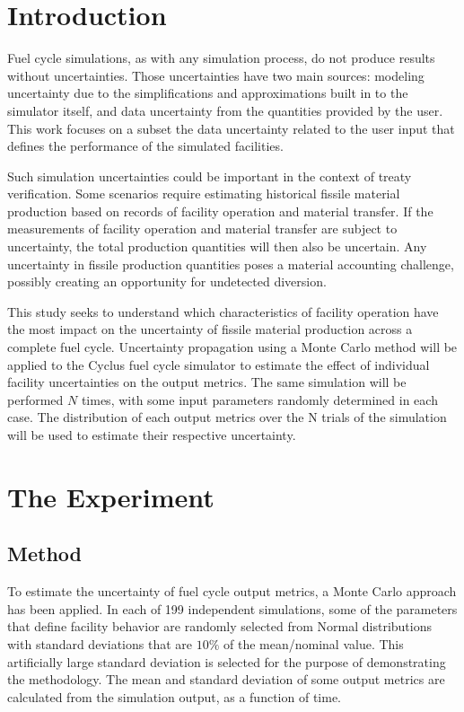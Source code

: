 \documentclass{anstrans}
\title{}
\author{Baptiste Mouginot, Kathryn Mummah, Paul P.H.  Wilson}
\institute{
University of Wisconsin-Madison, Madison, WI
}
\begin{document}
\section{Introduction}

Fuel cycle simulations, as with any simulation process, do not produce results
without uncertainties.  Those uncertainties have two main sources: modeling
uncertainty due to the simplifications and approximations built in to the
simulator itself, and data uncertainty from the quantities provided by the
user. This work focuses on a subset the data uncertainty related to
the user input that defines the performance of the simulated facilities.

Such simulation uncertainties could be important in the context of treaty
verification.  Some scenarios require estimating historical fissile material
production based on records of facility operation and material transfer.  If
the measurements of facility operation and material transfer are subject to
uncertainty, the total production quantities will then also be uncertain.  Any
uncertainty in fissile production quantities poses a material accounting
challenge, possibly creating an opportunity for undetected diversion.

This study seeks to understand which characteristics of facility operation have the
most impact on the uncertainty of fissile material production across a complete
fuel cycle.  Uncertainty propagation using a Monte Carlo method will be applied
to the Cyclus fuel cycle simulator \cite{cyclus} to estimate the effect of
individual facility uncertainties on the output metrics. The same simulation
will be performed $N$ times, with some input parameters randomly determined in each case.
The distribution of each output metrics over the N trials of the simulation
will be used to estimate their
respective uncertainty.

\section{The Experiment}

\subsection{Method}

To estimate the uncertainty of fuel cycle output metrics, a Monte
Carlo approach has been applied.  In each of 199 independent simulations,
some of the parameters that define facility behavior are randomly selected
from Normal distributions with standard deviations that are $10\%$ of the mean/nominal
value.  This artificially large standard deviation is selected for the purpose
of demonstrating the methodology.  The mean and standard deviation of some
output metrics are calculated from the simulation output, as a function of time.
\end{document}
